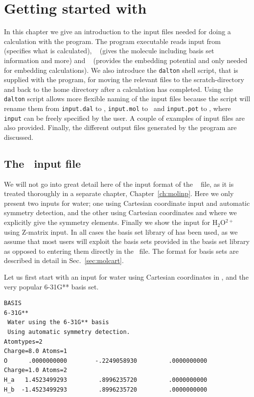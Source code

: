 \chapter{Getting started with {\dalton}}\label{ch:starting}

In this chapter we give an introduction to the input files needed
for doing a calculation with the {\dalton} program. The program executable reads input
from \dalinp\  (specifies what is calculated), \molinp\  (gives
the molecule including basis set information and more) and \potinp\  (provides the embedding potential and only needed for
embedding calculations). We also introduce the \verb|dalton| shell script,
that is supplied with the program, for moving the relevant files to the
scratch-directory and back to the home directory after a calculation has completed.
Using the \verb|dalton| script allows more flexible naming of the input files because the script will rename them from \verb|input.dal| to \dalinp, \verb|input.mol| to \molinp\ and \verb|input.pot| to \potinp, where \verb|input| can be freely specified by the user.
A couple of examples of input files are also provided. Finally, the different output
files generated by the program are discussed.

\section{The \molinp\ input file}

We will not go into great detail here of the input format of the \molinp\  file, as it is treated thoroughly in a separate chapter,
Chapter~\ref{ch:molinp}.
Here we only present two inputs for water; one
using Cartesian coordinate input and
automatic symmetry detection, and
the other using Cartesian coordinates and where we explicitly give the
symmetry elements. Finally we show the input for H$_{2}$O$^{2+}$
using Z-matrix input. In
all cases the basis set library of {\dalton} has been used, as we
assume that most users will exploit the basis sets provided in the basis
set library as opposed to entering them directly in the \molinp\ file. The format for basis sets are described in detail in Sec.~\ref{sec:molcart}.

Let us first start with an input for water using Cartesian coordinates
in \bohr{}, and the very popular 6-31G** basis set.

\begin{verbatim}
BASIS
6-31G**
 Water using the 6-31G** basis
 Using automatic symmetry detection.
Atomtypes=2
Charge=8.0 Atoms=1
O      .0000000000        -.2249058930         .0000000000
Charge=1.0 Atoms=2
H_a   1.4523499293         .8996235720         .0000000000
H_b  -1.4523499293         .8996235720         .0000000000
\end{verbatim}


